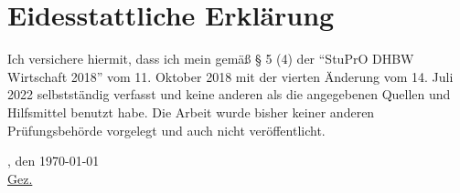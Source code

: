 \chapter*{Eidesstattliche Erklärung}
Ich versichere hiermit, dass ich mein \arbeit{} gemäß § 5 (4) der \enquote{StuPrO DHBW Wirtschaft 2018} vom 11. Oktober 2018 mit der vierten Änderung vom 14. Juli 2022 selbstständig verfasst und keine anderen als die angegebenen Quellen und Hilfsmittel benutzt habe. Die Arbeit wurde bisher keiner anderen Prüfungsbehörde vorgelegt und auch nicht veröffentlicht.

\vspace{1cm}

\verfassungsort, den \today \\[0.5cm]
	{\underline{Gez. \autor}}
	{\makebox[6cm]{\hrulefill}}\\ 
\autorReverse
